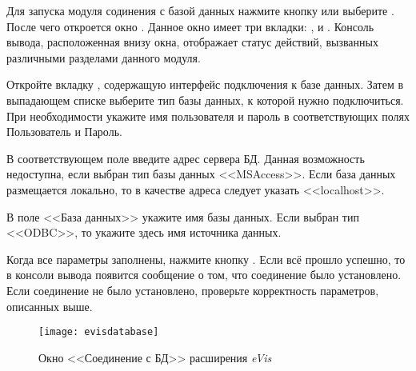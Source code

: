 \label{evis_launch_database}

Для запуска модуля содинения с базой данных нажмите кнопку
 или выберите  \arrow
{} \arrow {}.
После чего откроется окно . Данное окно имеет
три вкладки: ,  и
. Консоль вывода, расположенная внизу окна, отображает
статус действий, вызванных различными разделами данного модуля.

\label{evis_connect_database}

Откройте вкладку , содержащую интерфейс подключения
к базе данных. Затем в выпадающем списке 
выберите тип базы данных, к которой нужно подключиться. При необходимости
укажите имя пользователя и пароль в соответствующих полях Пользователь и
Пароль.

В соответствующем поле введите адрес сервера БД. Данная возможность
недоступна, если выбран тип базы данных <<MSAccess>>. Если база данных
размещается локально, то в качестве адреса следует указать <<localhost>>.

В поле <<База данных>> укажите имя базы данных. Если выбран тип <<ODBC>>, то
укажите здесь имя источника данных.

Когда все параметры заполнены, нажмите кнопку . Если всё
прошло успешно, то в консоли вывода появится сообщение о том, что соединение
было установлено. Если соединение не было установлено, проверьте корректность
параметров, описанных выше.

\begin{figure}[ht]
   \centering
   \texttt{[image: evisdatabase]}
   \caption{\label{evisdatabase}Окно <<Соединение с БД>> расширения \emph{eVis} \wincaption}
\end{figure}

